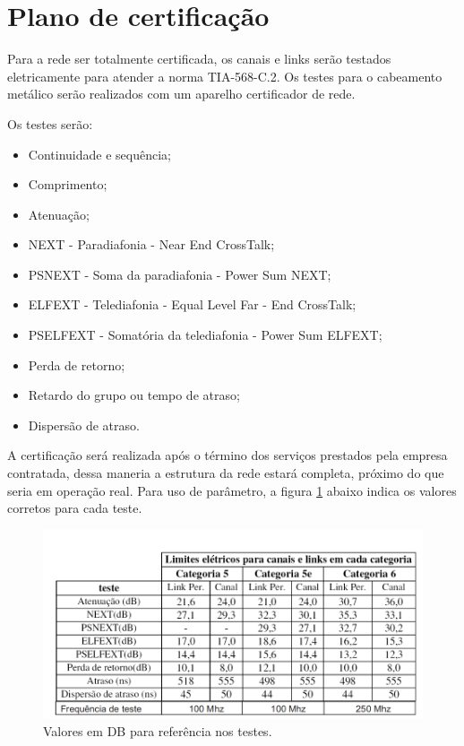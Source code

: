 \documentclass[	DIV=calc,%
							paper=a4,%
							fontsize=12pt,%
							onecolumn]{scrartcl}	 					%
\begin{document}
\section{Plano de certificação}
Para a rede ser totalmente certificada, os canais e links serão testados eletricamente para atender a norma TIA-568-C.2. Os testes para o cabeamento metálico serão realizados com um aparelho certificador de rede.

Os testes serão:
\begin{itemize}
	\item Continuidade e sequência;
	\item Comprimento;
	\item Atenuação;
	\item NEXT - Paradiafonia - Near End CrossTalk;
	\item PSNEXT - Soma da paradiafonia - Power Sum NEXT;
	\item ELFEXT - Telediafonia - Equal Level Far - End CrossTalk;
	\item PSELFEXT - Somatória da telediafonia - Power Sum ELFEXT;
	\item Perda de retorno;
	\item Retardo do grupo ou tempo de atraso;
	\item Dispersão de atraso.	
\end{itemize}
A certificação será realizada após o término dos serviços prestados pela empresa contratada, dessa maneria a estrutura da rede estará completa, próximo do que seria em operação real. Para uso de parâmetro, a figura \ref{certificacao} abaixo indica os valores corretos para cada teste.

\begin{figure}[h!]
	\centering
	\includegraphics[scale=0.3]{certificacao}
	\caption{Valores em DB para referência nos testes.}
	\label{certificacao}
\end{figure}
\end{document}
